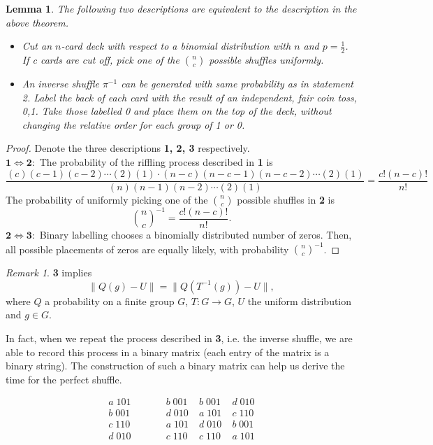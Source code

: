 \documentclass[12pt]{article}
\theoremstyle{plain}
\newtheorem{lemma}{Lemma}
\theoremstyle{definition}
\theoremstyle{remark}
\newtheorem*{remark}{Remark}
\begin{document}
\begin{lemma}\cite[Lemma~7 on \pno~343]{1.1}
The following two descriptions are equivalent to the description in the above theorem.
\begin{itemize}
    \item Cut an $n$-card deck with respect to a binomial distribution with $n$ and $p=\frac{1}{2}$. If c cards are cut off, pick one of the $\binom{n}{c}$ possible shuffles uniformly.
    \item An inverse shuffle $\pi^{-1}$ can be generated with same probability as in statement 2. Label the back of each card with the result of an independent, fair coin toss, {0,1}. Take those labelled 0 and place them on the top of the deck, without changing the relative order for each group of 1 or 0. 
\end{itemize}
\end{lemma}

\begin{proof}
Denote the three descriptions \textbf{1, 2, 3} respectively.\\
$\mathbf{1 \iff 2} :$ The probability of the riffling process described in \textbf{1} is $$\frac{(c)(c-1)(c-2)\cdots(2)(1)\cdot(n-c)(n-c-1)(n-c-2)\cdots(2)(1)}{(n)(n-1)(n-2)\cdots(2)(1)}=\frac{c!(n-c)!}{n!}$$
The probability of uniformly picking one of the $\binom{n}{c}$ possible shuffles in \textbf{2} is 
$$\binom{n}{c}^{-1}=\frac{c!(n-c)!}{n!}.$$ 
$\mathbf{2 \iff 3} :$ Binary labelling chooses a binomially distributed number of zeros. Then, all possible placements of zeros are equally likely, with probability $\binom{n}{c}^{-1}$.
\end{proof}


\begin{remark}\cite[Lemma~8 on \pno~343]{1.1}
\textbf{3} implies $$\big\|Q(g)-U\big\|=\big\|Q(T^{-1}(g))-U\big\|,$$ where $Q$ a probability on a finite group $G$, $T:G\rightarrow G$, $U$ the uniform distribution and $g\in G$.
\end{remark}

In fact, when we repeat the process described in \textbf{3}, i.e. the inverse shuffle, we are able to record this process in a binary matrix \cite[344]{1.1} (each entry of the matrix is a binary string). The construction of such a binary matrix can help us derive the time for the perfect shuffle.

\[\begin{matrix}
a\;101 & \;\;\;\;\;\;\;\;\;\; b\;001 & \;b\;001 & \;d\;010\\
b\;001 & \;\;\;\;\;\;\;\;\;\; d\;010 & \;a\;101 & \;c\;110\\
c\;110 & \;\;\;\;\;\;\;\;\;\; a\;101 & \;d\;010 & \;b\;001\\
d\;010 & \;\;\;\;\;\;\;\;\;\; c\;110 & \;c\;110 & \;a\;101
\end{matrix}\]
\end{document}
